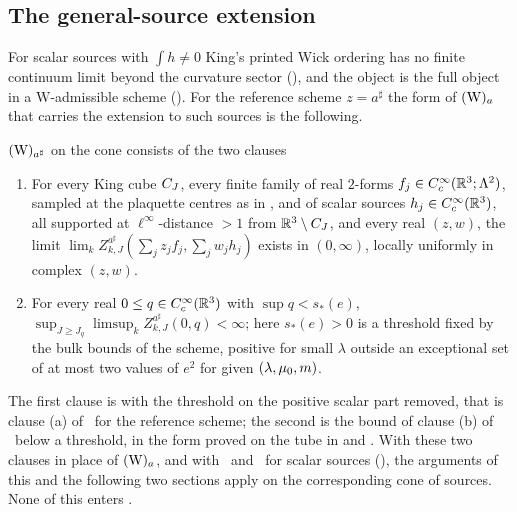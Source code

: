 \subsection{The general-source extension}

For scalar sources with $\int h\ne0$ King's printed Wick ordering has no finite continuum limit beyond the curvature sector (), and the object is the full object in a $\mathrm W$-admissible scheme (). For the reference scheme $z=a^\sharp$ the form of $(\mathrm W)_{a}$ that carries the extension to such sources is the following.

\begin{remark}\label{rot:hyp:Wsharp}
$(\mathrm W)_{a^\sharp}$ on the cone consists of the two clauses
\begin{enumerate}[leftmargin=*]
\item[$(\mathrm W^\sharp1)$] For every King cube $C_J$, every finite family of real $2$-forms $f_j\in C^\infty_c(\mathbb R^3;\Lambda^2)$, sampled at the plaquette centres as in , and of scalar sources $h_j\in C^\infty_c(\mathbb R^3)$, all supported at $\ell^\infty$-distance $>1$ from $\mathbb R^3\setminus C_J$, and every real $(z,w)$, the limit $\lim_kZ^{a^\sharp}_{k,J}(\sum_jz_jf_j,\sum_jw_jh_j)$ exists in $(0,\infty)$, locally uniformly in complex $(z,w)$.
\item[$(\mathrm W^\sharp2)$] For every real $0\le q\in C^\infty_c(\mathbb R^3)$ with $\sup q<s_*(e)$, $\sup_{J\ge J_q}\limsup_kZ^{a^\sharp}_{k,J}(0,q)<\infty$; here $s_*(e)>0$ is a threshold fixed by the bulk bounds of the scheme, positive for small $\lambda$ outside an exceptional set of at most two values of $e^2$ for given $(\lambda,\mu_0,m)$.
\end{enumerate}
The first clause is  with the threshold on the positive scalar part removed, that is clause (a) of \Wtwo\ for the reference scheme; the second is the bound of clause (b) of \Wtwo\ below a threshold, in the form proved on the tube in  and . With these two clauses in place of $(\mathrm W)_{a}$, and with \Ka\ and \TIa\ for scalar sources (), the arguments of this and the following two sections apply on the corresponding cone of sources. None of this enters .
\end{remark}
